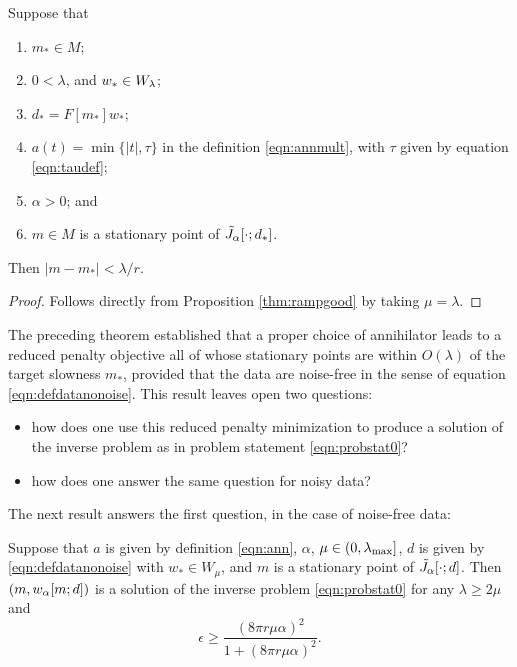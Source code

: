 \begin{theorem}
  \label{thm:rampreallygood}
  Suppose that
  \begin{enumerate}
  \item $m_* \in M$;
  \item $0 <  \lambda$, and $w_* \in W_{\lambda}$;
  \item $d_* = F[m_*]w_*$;
  \item $a(t)=\min\{|t|,\tau\}$ in the definition \ref{eqn:annmult},
    with $\tau$ given by equation \ref{eqn:taudef}; 
  \item $\alpha > 0$; and
  \item$m \in M$ is a stationary point of $\tilde{J}_{\alpha}[\cdot;d_*]$.
  \end{enumerate}
  Then $|m-m_*| < \lambda /r$.
\end{theorem}

\begin{proof} Follows directly from Proposition \ref{thm:rampgood} by
  taking $\mu=\lambda$.
\end{proof}

The preceding theorem established that a proper choice of annihilator
leads to a reduced penalty objective all of whose stationary points
are within $O(\lambda)$ of the target slowness $m_*$, provided that
the data are noise-free in the sense of equation
\ref{eqn:defdatanonoise}. This result leaves open two questions:
\begin{itemize}
\item how does one use this reduced penalty minimization to produce
  a solution of the inverse problem as in problem statement
  \ref{eqn:probstat0}? 
\item how does one answer the same question for noisy data?
\end{itemize}

The next result answers the first question, in the case of noise-free data:
\begin{proposition}
  \label{thm:ipnonoisesuf}
  Suppose that $a$ is given by definition \ref{eqn:ann}, $\alpha$,
  $\mu \in (0,\lambda_{\rm max}]$,
  $d$ is given by
  \ref{eqn:defdatanonoise} with $w_* \in W_{\mu}$, and  $m$ is a stationary
  point of $\tilde{J}_{\alpha}[\cdot;d]$. Then $(m,w_{\alpha}[m;d])$ is a
  solution of the inverse problem \ref{eqn:probstat0} for any $\lambda
  \ge 2\mu$ and
  \begin{equation}
    \label{eqn:estresidnorm}
    \epsilon \ge \frac{(8\pi r \mu \alpha)^2}{1 + (8\pi r \mu\alpha)^2}.
  \end{equation}
\end{proposition}

